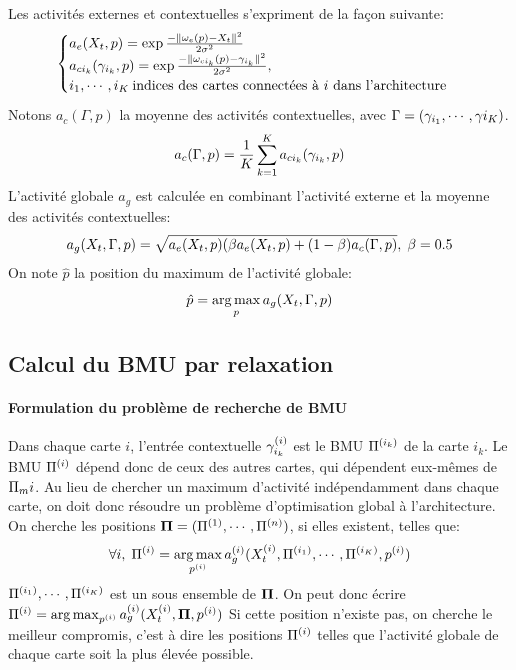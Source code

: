 Les activités externes et contextuelles s'expriment de la façon suivante:
\begin{equation}
\label{eq:activite}
\begin{cases}
a_e(X_t,p) = \exp\frac{-\lVert \omega_e(p)-X_t \rVert^2}{2\sigma^2} \\
a_{ci_k}(\gamma_{i_k},p) = \exp\frac{-\lVert \omega_{ci_k}(p)-\gamma_{i_k} \rVert ^2}{2\sigma^2}, \\
i_1, \cdots, i_K\: \text{indices des cartes connectées à $i$ dans l'architecture}
\end{cases}
\end{equation}
Notons $a_c(\Gamma,p)$ la moyenne des activités contextuelles, avec $\Gamma = (\gamma_{i_1}, \cdots, \gamma{i_K})$.
\begin{equation}
a_c(\Gamma,p) = \frac{1}{K}\sum_{k=1}^K {a_{ci_k}(\gamma_{i_k},p)}
\end{equation}
L'activité globale $a_g$ est calculée en combinant l'activité externe et la moyenne des activités contextuelles:
\begin{equation}
\label{eq:global_act}
a_g(X_t,\Gamma,p) = \sqrt{a_e(X_t,p)(\beta a_e(X_t,p) + (1-\beta) a_c(\Gamma,p)}, \; \beta=0.5
\end{equation} 
On note $\hat{p}$ la position du maximum de l'activité globale:
\begin{equation}
\label{argmax}
\hat{p} = \operatorname*{arg\,max}_p a_g(X_t, \Gamma,p)
\end{equation}

\subsection{Calcul du BMU par relaxation}\label{sec:relax}

\paragraph{Formulation du problème de recherche de BMU}
Dans chaque carte $i$, l'entrée contextuelle $\gamma^{({i})}_{i_k}$ est le BMU $\Pi^{({i_k})}$  de la carte $i_k$. Le BMU $\Pi^{({i})}$ dépend donc de ceux des autres cartes, qui dépendent eux-mêmes de $\Pi_m{i}$. Au lieu de chercher un maximum d'activité indépendamment dans chaque carte, on doit donc résoudre un problème d'optimisation global à  l'architecture. On cherche les positions $\mathbf{\Pi} = (\Pi^{({1})}, \cdots, \Pi^{({n})})$, si elles existent, telles que:
\begin{equation}
\forall i, \; \Pi^{({i})} = \operatorname*{arg\,max}_{p^{({i})}} a_g^{({i})}(X^{({i})}_t, \Pi^{({i_1})}, \cdots, \Pi^{({i_K})},p^{({i})})
\end{equation}
$\Pi^{({i_1})}, \cdots, \Pi^{({i_K})}$ est un sous ensemble de $\mathbf{\Pi}$. On peut donc écrire $\Pi^{({i})} = \operatorname*{arg\,max}_{p^{({i})}} a_g^{({i})}(X^{({i})}_t, \mathbf{\Pi}, p^{({i})})$
Si cette position n'existe pas, on cherche le meilleur compromis, c'est à dire les positions $\Pi^{({i})}$ telles que l'activité globale de chaque carte soit la plus élevée possible.



